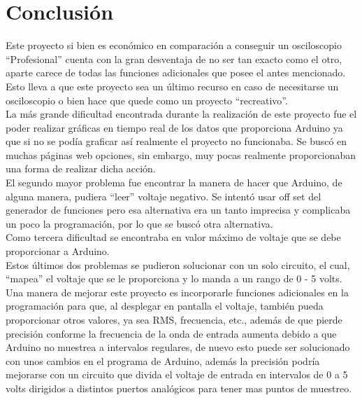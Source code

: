 \documentclass{article}
\begin{document}
\section{Conclusión}
Este proyecto si bien es económico en comparación a conseguir un osciloscopio
“Profesional” cuenta con la gran desventaja de no ser tan exacto como el otro, aparte
carece de todas las funciones adicionales que posee el antes mencionado. Esto lleva a que
este proyecto sea un último recurso en caso de necesitarse un osciloscopio o bien hace que
quede como un proyecto “recreativo”.\\
La más grande dificultad encontrada durante la realización de este proyecto fue el poder
realizar gráficas en tiempo real de los datos que proporciona Arduino ya que si no se
podía graficar así realmente el proyecto no funcionaba. Se buscó en muchas páginas web
opciones, sin embargo, muy pocas realmente proporcionaban una forma de realizar dicha
acción.\\
El segundo mayor problema fue encontrar la manera de hacer que Arduino, de alguna manera,
pudiera “leer” voltaje negativo. Se intentó usar off set del generador de funciones  pero
esa alternativa era un tanto imprecisa y complicaba un poco la programación, por lo que se
buscó otra alternativa.\\
Como tercera dificultad se encontraba en valor máximo de voltaje que se debe proporcionar
a Arduino.\\
Estos últimos dos problemas se pudieron solucionar con un solo circuito, el cual, “mapea”
el voltaje que se le proporciona y lo manda a un rango de 0 - 5 volts.\\
Una manera de mejorar este proyecto es incorporarle funciones adicionales en la
programación para que, al desplegar en pantalla el voltaje, también pueda proporcionar
otros valores, ya sea RMS, frecuencia, etc., además de que pierde precisión conforme la
frecuencia de la onda de entrada aumenta debido a que Arduino no muestrea a intervalos
regulares, de nuevo esto puede ser solucionado con unos cambios en el programa de
Arduino, además la precisión podría mejorarse con un circuito que divida el voltaje de
entrada en intervalos de 0 a 5 volts dirigidos a distintos puertos analógicos para tener
mas puntos de muestreo.
\end{document}
